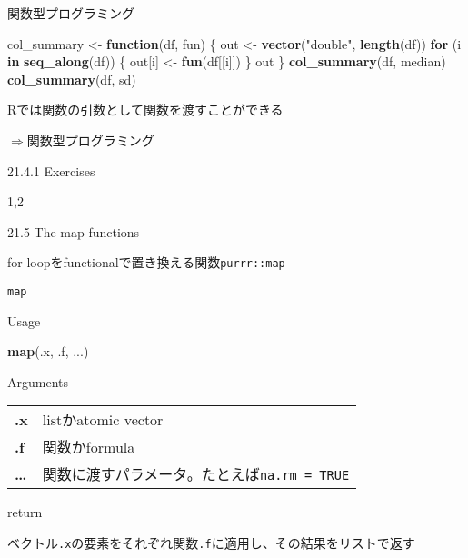 \documentclass[ignorenonframetext,]{beamer}
\newenvironment{Shaded}{\begin{snugshade}}{\end{snugshade}}
\newcommand{\KeywordTok}[1]{\textcolor[rgb]{0.13,0.29,0.53}{\textbf{#1}}}
\newcommand{\StringTok}[1]{\textcolor[rgb]{0.31,0.60,0.02}{#1}}
\newcommand{\ControlFlowTok}[1]{\textcolor[rgb]{0.13,0.29,0.53}{\textbf{#1}}}
\newcommand{\NormalTok}[1]{#1}
\begin{document}
\begin{frame}[fragile]{関数型プログラミング}

\begin{Shaded}
\begin{Highlighting}[]
\NormalTok{col_summary <-}\StringTok{ }\ControlFlowTok{function}\NormalTok{(df, fun) \{}
\NormalTok{    out <-}\StringTok{ }\KeywordTok{vector}\NormalTok{(}\StringTok{"double"}\NormalTok{, }\KeywordTok{length}\NormalTok{(df))}
  \ControlFlowTok{for}\NormalTok{ (i }\ControlFlowTok{in} \KeywordTok{seq_along}\NormalTok{(df)) \{}
\NormalTok{        out[i] <-}\StringTok{ }\KeywordTok{fun}\NormalTok{(df[[i]])}
\NormalTok{    \}}
\NormalTok{    out}
\NormalTok{\}}
\KeywordTok{col_summary}\NormalTok{(df, median)}
\KeywordTok{col_summary}\NormalTok{(df, sd)}
\end{Highlighting}
\end{Shaded}

Rでは関数の引数として関数を渡すことができる

\(\Rightarrow\)関数型プログラミング

\end{frame}

\begin{frame}{21.4.1 Exercises}

1,2

\end{frame}

\begin{frame}[fragile]{21.5 The map functions}

for loopをfunctionalで置き換える関数\texttt{purrr::map}

\end{frame}

\begin{frame}[fragile]{\texttt{map}}

\begin{block}{Usage}

\begin{Shaded}
\begin{Highlighting}[]
\KeywordTok{map}\NormalTok{(.x, .f, ...)}
\end{Highlighting}
\end{Shaded}

\end{block}

\begin{block}{Arguments}

\begin{longtable}[]{@{}ll@{}}
\toprule
\textbf{.x} & listかatomic vector\tabularnewline
\textbf{.f} & 関数かformula\tabularnewline
\textbf{\ldots{}} &
関数に渡すパラメータ。たとえば\texttt{na.rm\ =\ TRUE}\tabularnewline
\bottomrule
\end{longtable}

\end{block}

\begin{block}{return}

ベクトル\texttt{.x}の要素をそれぞれ関数\texttt{.f}に適用し、その結果をリストで返す

\end{block}

\end{frame}
\end{document}
